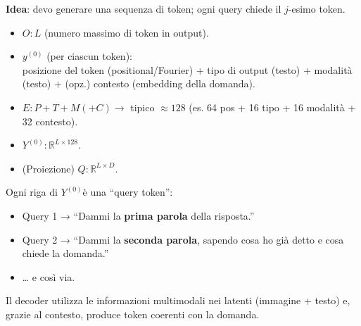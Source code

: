\documentclass[
  11pt,
]{article}
\begin{document}
\textbf{Idea}: devo generare una sequenza di token; ogni query chiede il
\(j\)-esimo token.

\begin{itemize}
\item
  \(O:L\) (numero massimo di token in output).
\item
  \(y^{(0)}\) (per ciascun token):\\
  posizione del token (positional/Fourier) + tipo di output (testo) +
  modalità (testo) + (opz.) contesto (embedding della domanda).
\item
  \(E:P + T + M( + C) \rightarrow\) tipico \(\approx 128\) (es. 64 pos +
  16 tipo + 16 modalità + 32 contesto).
\item
  \(Y^{(0)}:\mathbb{R}^{L \times 128}\).
\item
  (Proiezione) \(Q:\mathbb{R}^{L \times D}\).
\end{itemize}

Ogni riga di \(Y^{(0)}\)è una ``query token'':

\begin{itemize}
\item
  Query 1 → ``Dammi la \textbf{prima parola} della risposta.''
\item
  Query 2 → ``Dammi la \textbf{seconda parola}, sapendo cosa ho già
  detto e cosa chiede la domanda.''
\item
  \ldots{} e così via.
\end{itemize}

Il decoder utilizza le informazioni multimodali nei latenti (immagine +
testo) e, grazie al contesto, produce token coerenti con la domanda.
\end{document}
